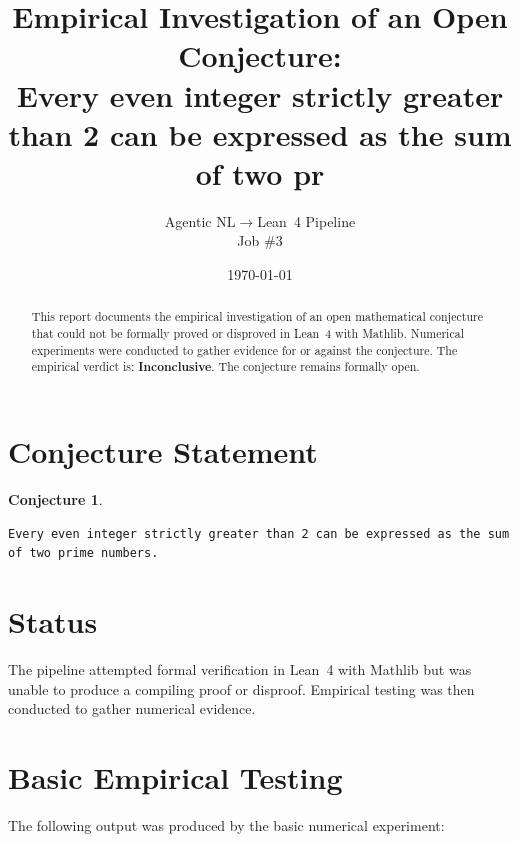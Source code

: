 \documentclass[11pt]{article}
\title{Empirical Investigation of an Open Conjecture:\\
Every even integer strictly greater than 2 can be expressed as the sum of two pr}
\author{Agentic NL$\to$Lean~4 Pipeline \\ \small Job \#3}
\date{\today}
\newtheorem{conjecture}{Conjecture}
\begin{document}
\maketitle

\begin{abstract}
This report documents the empirical investigation of an open mathematical conjecture
that could not be formally proved or disproved in Lean~4 with Mathlib.
Numerical experiments were conducted to gather evidence for or against the conjecture.
The empirical verdict is: \textbf{\textcolor{orange!80!black}{Inconclusive}}.
The conjecture remains formally open.
\end{abstract}

\section{Conjecture Statement}

\begin{conjecture}
\begin{lstlisting}
Every even integer strictly greater than 2 can be expressed as the sum of two prime numbers.
\end{lstlisting}
\end{conjecture}

\section{Status}

\begin{center}
\end{center}

The pipeline attempted formal verification in Lean~4 with Mathlib but was unable to
produce a compiling proof or disproof. Empirical testing was then conducted to gather
numerical evidence.

\section{Basic Empirical Testing}

The following output was produced by the basic numerical experiment:
\end{document}
